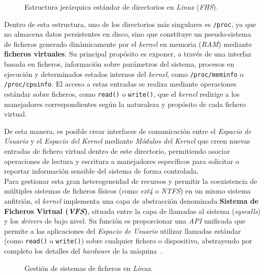 \begin{figure}[H]
  \centering
  \scalebox{0.8}{}
  \caption{Estructura jerárquica estándar de directorios en \textit{Linux} (\textit{FHS}).}
  \label{fig:fhs}
\end{figure}

Dentro de esta estructura, uno de los directorios más singulares es \texttt{/proc}, ya que no almacena datos persistentes en disco, sino que constituye un pseudo-sistema de ficheros generado dinámicamente por el \textit{kernel} en memoria (\textit{RAM}) mediante \textbf{ficheros virtuales}.
Su principal propósito es exponer, a través de una interfaz basada en ficheros, información sobre parámetros del sistema, procesos en ejecución y determinados estados internos del \textit{kernel}, como \texttt{/proc/meminfo} o \texttt{/proc/cpuinfo}.
El acceso a estas entradas se realiza mediante operaciones estándar sobre ficheros, como \texttt{read()} o \texttt{write()}, que el \textit{kernel} redirige a los manejadores correspondientes según la naturaleza y propósito de cada fichero virtual.

De esta manera, es posible crear interfaces de comunicación entre el \textit{Espacio de Usuario} y el \textit{Espacio del Kernel} mediante \textit{Módulos del Kernel} que creen nuevas entradas de fichero virtual dentro de este directorio,
permitiendo asociar operaciones de lectura y escritura a manejadores específicos para solicitar o reportar información sensible del sistema de forma controlada.\\

Para gestionar esta gran heterogeneidad de recursos y permitir la coexistencia de múltiples sistemas de ficheros físicos (como \textit{ext4} o \textit{NTFS}) en un mismo sistema anfitrión, el \textit{kernel} implementa una capa de abstracción denominada \textbf{Sistema de Ficheros Virtual (\textit{VFS})},
situada entre la capa de llamadas al sistema (\textit{syscalls}) y los \textit{drivers} de bajo nivel.
Su función es proporcionar una \textit{API} unificada que permite a las aplicaciones del \textit{Espacio de Usuario} utilizar llamadas estándar (como \texttt{read()} o \texttt{write()}) sobre cualquier fichero o dispositivo, abstrayendo por completo los detalles del \textit{hardware} de la máquina~\cite{librossoo}.\\

\begin{figure}[h!]
  \centering
  \scalebox{0.8}{}
  \caption{Gestión de sistemas de ficheros en \textit{Linux}.}
  \label{fig:vfs}
\end{figure}


